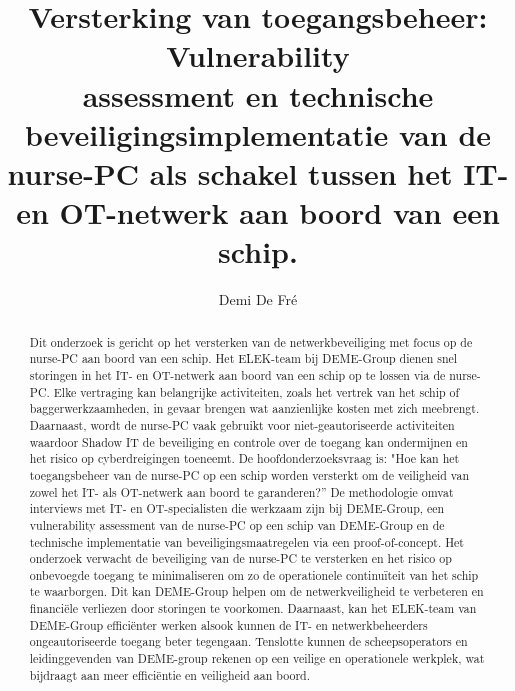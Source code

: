 \documentclass{hogent-article}
\title{Versterking van toegangsbeheer: Vulnerability \\ assessment en technische beveiligingsimplementatie van de nurse-PC als schakel tussen het IT- en OT-netwerk aan boord van een schip.}
\author{Demi De Fré}
\begin{document}
\begin{abstract}
  Dit onderzoek is gericht op het versterken van de netwerkbeveiliging met focus op de nurse-PC aan boord van een schip. Het ELEK-team bij DEME-Group 
  dienen snel storingen in het IT- en OT-netwerk aan boord van een schip  op te lossen via de nurse-PC. Elke vertraging kan belangrijke activiteiten, 
  zoals het vertrek van het schip of baggerwerkzaamheden, in gevaar brengen wat aanzienlijke kosten met zich meebrengt. Daarnaast, wordt de nurse-PC vaak 
  gebruikt voor niet-geautoriseerde activiteiten waardoor Shadow IT de beveiliging en controle over de toegang kan ondermijnen en het risico op cyberdreigingen 
  toeneemt. De hoofdonderzoeksvraag is: "Hoe kan het toegangsbeheer van de nurse-PC op een schip worden versterkt om de veiligheid van zowel het IT- als OT-netwerk 
  aan boord te garanderen?” De methodologie omvat interviews met IT- en OT-specialisten die werkzaam zijn bij DEME-Group, een vulnerability assessment van 
  de nurse-PC op een schip van DEME-Group en de technische implementatie van beveiligingsmaatregelen via een proof-of-concept. Het onderzoek verwacht de 
  beveiliging van de nurse-PC te versterken en het risico op onbevoegde toegang te minimaliseren om zo de operationele continuïteit van het schip te waarborgen. 
  Dit kan DEME-Group helpen om de netwerkveiligheid te verbeteren en financiële verliezen door storingen te voorkomen. Daarnaast, kan het ELEK-team van DEME-Group 
  efficiënter werken alsook kunnen de  IT- en netwerkbeheerders ongeautoriseerde toegang beter tegengaan. Tenslotte kunnen de scheepsoperators en leidinggevenden 
  van DEME-group rekenen op een veilige en operationele werkplek, wat bijdraagt aan meer efficiëntie en veiligheid aan boord.
\end{abstract}

\tableofcontents


\end{document}
